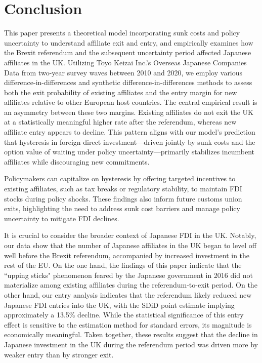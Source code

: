 \documentclass[preprint,11pt,authoryear]{elsarticle}
\begin{document}
\section{Conclusion\label{sec:conclusion}}

This paper presents a theoretical model incorporating sunk costs and policy uncertainty to understand affiliate exit and entry, and empirically examines how the Brexit referendum and the subsequent uncertainty period affected Japanese affiliates in the UK. Utilizing Toyo Keizai Inc.’s Overseas Japanese Companies Data from two-year survey waves between 2010 and 2020, we employ various difference-in-differences and synthetic difference-in-differences methods to assess both the exit probability of existing affiliates and the entry margin for new affiliates relative to other European host countries. The central empirical result is an asymmetry between these two margins. Existing affiliates do not exit the UK at a statistically meaningful higher rate after the referendum, whereas new affiliate entry appears to decline. This pattern aligns with our model’s prediction that hysteresis in foreign direct investment---driven jointly by sunk costs and the option value of waiting under policy uncertainty---primarily stabilizes incumbent affiliates while discouraging new commitments.

Policymakers can capitalize on hysteresis by offering targeted incentives to existing affiliates, such as tax breaks or regulatory stability, to maintain FDI stocks during policy shocks. These findings also inform future customs union exits, highlighting the need to address sunk cost barriers and manage policy uncertainty to mitigate FDI declines.

It is crucial to consider the broader context of Japanese FDI in the UK. Notably, our data show that the number of Japanese affiliates in the UK began to level off well before the Brexit referendum, accompanied by increased investment in the rest of the EU. On the one hand, the findings of this paper indicate that the ``upping sticks" phenomenon feared by the Japanese government in 2016 did not materialize among existing affiliates during the referendum-to-exit period. On the other hand, our entry analysis indicates that the referendum likely reduced new Japanese FDI entries into the UK, with the SDiD point estimate implying approximately a 13.5\% decline. While the statistical significance of this entry effect is sensitive to the estimation method for standard errors, its magnitude is economically meaningful. Taken together, these results suggest that the decline in Japanese investment in the UK during the referendum period was driven more by weaker entry than by stronger exit.
\end{document}
